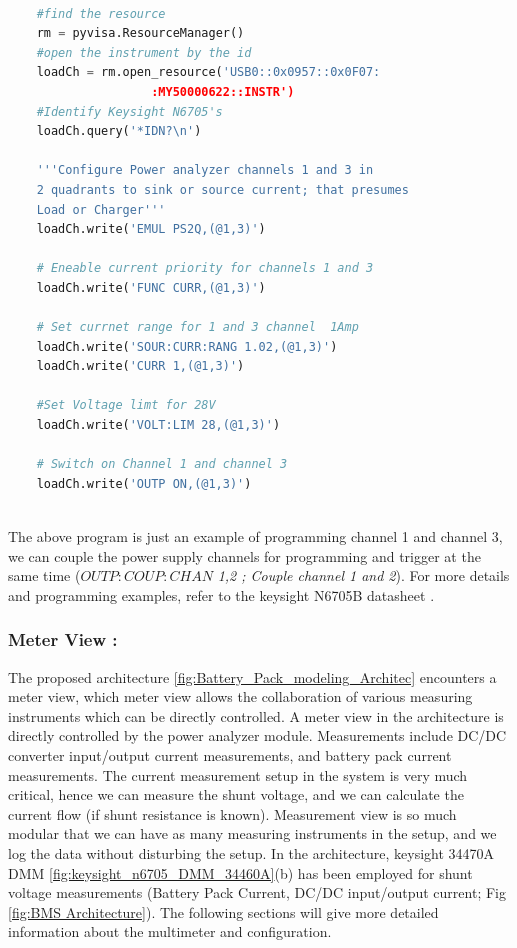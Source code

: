 \begin{lstlisting}[language=Python, caption=Load/Charger Configuration for Keysight N6705's]

    #find the resource
    rm = pyvisa.ResourceManager()
    #open the instrument by the id 
    loadCh = rm.open_resource('USB0::0x0957::0x0F07:
                    :MY50000622::INSTR')
    #Identify Keysight N6705's
    loadCh.query('*IDN?\n')
    
    '''Configure Power analyzer channels 1 and 3 in 
    2 quadrants to sink or source current; that presumes 
    Load or Charger'''
    loadCh.write('EMUL PS2Q,(@1,3)')

    # Eneable current priority for channels 1 and 3
    loadCh.write('FUNC CURR,(@1,3)')
    
    # Set currnet range for 1 and 3 channel  1Amp
    loadCh.write('SOUR:CURR:RANG 1.02,(@1,3)')
    loadCh.write('CURR 1,(@1,3)')
    
    #Set Voltage limt for 28V
    loadCh.write('VOLT:LIM 28,(@1,3)')

    # Switch on Channel 1 and channel 3
    loadCh.write('OUTP ON,(@1,3)')
    
\end{lstlisting}

The above program is just an example of programming channel 1 and channel 3, we can couple the power supply channels for programming and trigger at the same time ($OUTP:COUP:CHAN$ \textit{1,2 ; Couple channel 1 and 2}). For more details and programming examples, refer to the keysight N6705B datasheet \cite{Keysight_N6705_DC_Power_Analyzer}.

\subsubsection{Meter View :}
The proposed architecture \ref{fig:Battery_Pack_modeling_Architec} encounters a meter view, which meter view allows the collaboration of various measuring instruments which can be directly controlled. A meter view in the architecture is directly controlled by the power analyzer module. Measurements include DC/DC converter input/output current measurements, and battery pack current measurements. The current measurement setup in the system is very much critical, hence we can measure the shunt voltage, and we can calculate the current flow (if shunt resistance is known). Measurement view is so much modular that we can have as many measuring instruments in the setup, and we log the data without disturbing the setup.
In the architecture, keysight 34470A DMM  \ref{fig:keysight_n6705_DMM_34460A}(b) has been employed for shunt voltage measurements (Battery Pack Current, DC/DC input/output current; Fig \ref{fig:BMS Architecture}). The following sections will give more detailed information about the multimeter and configuration.


